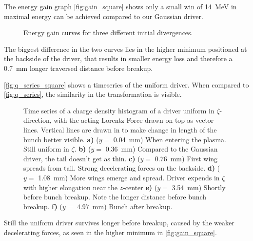 \documentclass[bachelor_thesis]{subfiles}
\begin{document}
The energy gain graph \autoref{fig:gain_square} shows only a small win of \qty{14}{\MeV} in maximal energy can be achieved compared to our Gaussian driver.
\begin{figure}
	\centering
	
	\caption{Energy gain curves for three different initial divergences.}
	\label{fig:gain_square}
\end{figure}
The biggest difference in the two curves lies in the higher minimum positioned at the backside of the driver, that results in smaller energy loss and therefore a \qty{0.7}{mm} longer traversed distance before breakup.

\autoref{fig:q_series_square} shows a timeseries of the uniform driver. When compared to \autoref{fig:q_series}, the similarity in the transformation is visible.
\begin{figure}
	\centering
	
	\caption{Time series of a charge density histogram of a driver uniform in $\zeta$-direction, with the acting Lorentz Force drawn on top as vector lines. Vertical lines are drawn in to make change in length of the bunch better visible. 
	\textbf{a)} ($y=$ \qty{0.04}{mm}) When entering the plasma. Still uniform in $\zeta$.
	\textbf{b)} ($y=$ \qty{0.36}{mm}) Compared to the Gaussian driver, the tail doesn't get as thin.
	\textbf{c)} ($y=$ \qty{0.76}{mm}) First wing spreads from tail. Strong decelerating forces on the backside.
	\textbf{d)} ($y=$ \qty{1.08}{mm}) More wings emerge and spread. Driver expends in $\zeta$ with higher elongation near the $z$-center
	\textbf{e)} ($y=$ \qty{3.54}{mm}) Shortly before bunch breakup. Note the longer distance before bunch breakup.
	\textbf{f)} ($y=$ \qty{4.97}{mm}) Bunch after breakup.}
	\label{fig:q_series_square}
\end{figure}
Still the uniform driver survives longer before breakup, caused by the weaker decelerating forces, as seen in the higher minimum in \autoref{fig:gain_square}.
\end{document}
